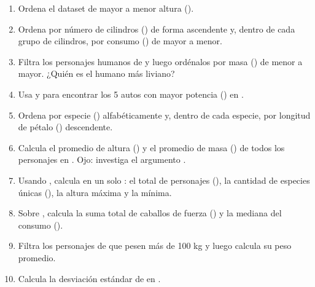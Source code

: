 \documentclass[8pt]{beamer}
\begin{document}
\begin{frame}[fragile]
\begin{enumerate}[start=12]
	\item Ordena el dataset  de mayor a menor altura ().
\item Ordena  por número de cilindros () de forma ascendente y, dentro de cada grupo de cilindros, por consumo () de mayor a menor.
\item Filtra los personajes humanos de  y luego ordénalos por masa () de menor a mayor. ¿Quién es el humano más liviano?
\item Usa  y  para encontrar los 5 autos con mayor potencia () en .
\item Ordena  por especie () alfabéticamente y, dentro de cada especie, por longitud de pétalo () descendente.
\item Calcula el promedio de altura () y el promedio de masa () de todos los personajes en . Ojo: investiga el argumento .
\item Usando , calcula en un solo : el total de personajes (), la cantidad de especies únicas (), la altura máxima y la mínima.
\item Sobre , calcula la suma total de caballos de fuerza () y la mediana del consumo ().
\item Filtra los personajes de  que pesen más de 100 kg y luego calcula su peso promedio.
\item Calcula la desviación estándar de  en .
\end{enumerate}
\end{frame}
\end{document}
